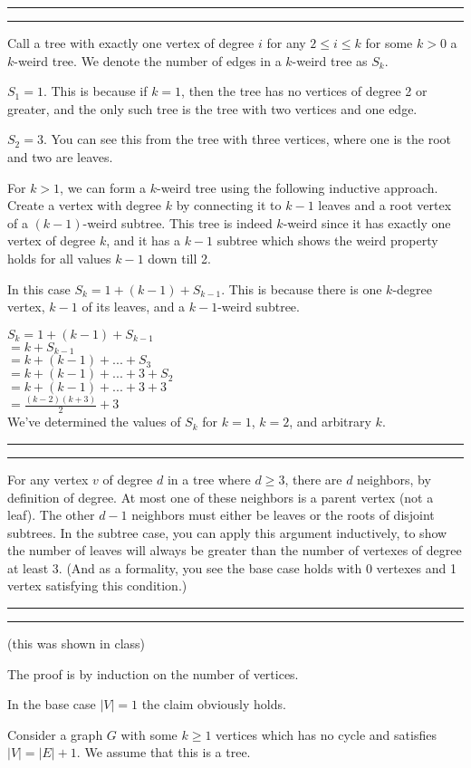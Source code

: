\documentclass[11pt,letterpaper]{article}
\newcommand{\question}[1] {\vspace{.25in} \hrule\vspace{0.5em}
\noindent{\bf #1} \vspace{0.5em}
\hrule \vspace{.10in}}
\begin{document}
\question{5}
Call a tree with exactly one vertex of degree $i$ for any $2 \leq i \leq k$ for some $k > 0$ a $k$-weird tree.
We denote the number of edges in a $k$-weird tree as $S_k$.

$S_1 = 1$. This is because if $k=1$, then the tree has no vertices of degree 2 or greater, and the only such tree is the tree with two vertices and one edge.

$S_2 = 3$. You can see this from the tree with three vertices, where one is the root and two are leaves.

For $k>1$, we can form a $k$-weird tree using the following inductive approach. Create a vertex with degree $k$ by connecting it to $k-1$ leaves and a root vertex of a $(k-1)$-weird subtree.
This tree is indeed $k$-weird since it has exactly one vertex of degree $k$, and it has a $k-1$ subtree which shows the weird property holds for all values $k-1$ down till 2.

In this case $S_k = 1 + (k-1) + S_{k-1}$. This is because there is one $k$-degree vertex, $k-1$ of its leaves, and a $k-1$-weird subtree.

$S_k = 1 + (k-1) + S_{k-1}$\\
$    = k + S_{k-1}$\\
$    = k + (k-1) + ... + S_3$\\
$    = k + (k-1) + ... + 3 + S_2$\\
$    = k + (k-1) + ... + 3 + 3$\\
$    = \frac{(k-2)(k+3)}{2} + 3$\\

We've determined the values of $S_k$ for $k=1$, $k=2$, and arbitrary $k$.

\question{6}
For any vertex $v$ of degree $d$ in a tree where $d \geq 3$, there are $d$ neighbors, by definition of degree.
At most one of these neighbors is a parent vertex (not a leaf). The other $d-1$ neighbors must either be leaves or the roots of disjoint subtrees.
In the subtree case, you can apply this argument inductively, to show the number of leaves will always be greater than the number of vertexes of degree at least 3.
(And as a formality, you see the base case holds with 0 vertexes and 1 vertex satisfying this condition.)


\question{7}
(this was shown in class)

The proof is by induction on the number of vertices.

In the base case $|V| = 1$ the claim obviously holds.

Consider a graph $G$ with some $k \geq 1$ vertices which has no cycle and satisfies $|V| = |E| + 1$.
We assume that this is a tree.
\end{document}
